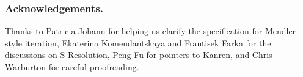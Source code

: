 \documentclass[runningheads,a4paper]{llncs}
\begin{document}
% 
% 
% 
% 

\subsubsection*{Acknowledgements.}
Thanks to Patricia Johann for helping us clarify the specification
for Mendler-style iteration, Ekaterina Komendantskaya and
Frantisek Farka for the discussions on S-Resolution,
Peng Fu for pointers to Kanren, and Chris Warburton for careful proofreading.
\makeatletter
\renewcommand\bibsection{\section*\bibname}
\makeatother



\end{document}
